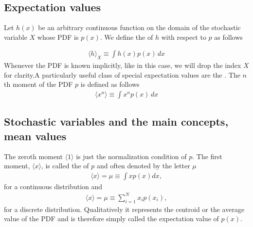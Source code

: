 \documentclass[letterpaper,10pt,english]{sphinxmanual}
\begin{document}
\subsection{Expectation values}
\label{\detokenize{chapter2:expectation-values}}
Let \(h(x)\) be an arbitrary continuous function on the domain of the stochastic
variable \(X\) whose PDF is \(p(x)\). We define the 
of \(h\) with respect to \(p\) as follows




\begin{equation*}
\begin{split}
\begin{equation}
\langle h \rangle_X \equiv \int\! h(x)p(x)\,dx
\label{eq:expectation_value_of_h_wrt_p} \tag{2}
\end{equation}
\end{split}
\end{equation*}
Whenever the PDF is known implicitly, like in this case, we will drop
the index \(X\) for clarity.A particularly useful class of special expectation values are the
. The \(n\)\sphinxhyphen{}th moment of the PDF \(p\) is defined as
follows
\begin{equation*}
\begin{split}
\langle x^n \rangle \equiv \int\! x^n p(x)\,dx
\end{split}
\end{equation*}

\subsection{Stochastic variables and the main concepts, mean values}
\label{\detokenize{chapter2:stochastic-variables-and-the-main-concepts-mean-values}}
The zero\sphinxhyphen{}th moment \(\langle 1\rangle\) is just the normalization condition of
\(p\). The first moment, \(\langle x\rangle\), is called the  of \(p\)
and often denoted by the letter \(\mu\)
\begin{equation*}
\begin{split}
\langle x\rangle  = \mu \equiv \int x p(x)dx,
\end{split}
\end{equation*}
for a continuous distribution and
\begin{equation*}
\begin{split}
\langle x\rangle  = \mu \equiv \sum_{i=1}^N x_i p(x_i),
\end{split}
\end{equation*}
for a discrete distribution.
Qualitatively it represents the centroid or the average value of the
PDF and is therefore simply called the expectation value of \(p(x)\).
\end{document}
